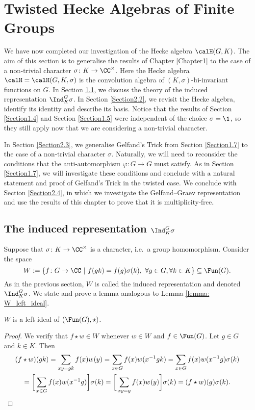 \section{Twisted Hecke Algebras of Finite Groups}\label{Chapter2}
We have now completed our investigation of the Hecke algebra $\calH(G,K)$.
The aim of this section is to generalise the results of Chapter \ref{Chapter1} to the case of a non-trivial character $\sigma\colon K\to\CC^\times$.
Here the Hecke algebra $\calH=\calH(G,K,\sigma)$ is the convolution algebra of $(K,\sigma)$-bi-invariant functions on $G$.
In Section \ref{Section2.1}, we discuss the theory of the induced representation $\Ind_K^G \sigma$.
In Section \ref{Section2.2}, we revisit the Hecke algebra, identify its identity and describe its basis.
Notice that the results of Section \ref{Section1.4} and Section \ref{Section1.5} were independent of the choice $\sigma=\1$, so they still apply now that we are considering a non-trivial character.

In Section \ref{Section2.3}, we generalise Gelfand's Trick from Section \ref{Section1.7} to the case of a non-trivial character $\sigma$.
Naturally, we will need to reconsider the conditions that the anti-automorphism $\varphi\colon G\to G$ must satisfy.
As in Section \ref{Section1.7}, we will investigate these conditions and conclude with a natural statement and proof of Gelfand's Trick in the twisted case.
We conclude with Section \ref{Section2.4}, in which we investigate the Gelfand--Graev representation and use the results of this chapter to prove that it is multiplicity-free.


\subsection{The induced representation $\Ind_K^G \sigma$}\label{Section2.1}
Suppose that $\sigma\colon K \to\CC^\times$ is a character, i.e.\ a group homomorphism.
Consider the space
\[
    W := \{f\colon G\to \CC\ |\ f(gk) = f(g)\sigma(k),\ \forall g\in G, \forall k \in K\} \subseteq \Fun(G).
\]
As in the previous section, $W$ is called the induced representation and denoted $\Ind_K^G \sigma$.
We state and prove a lemma analogous to Lemma \ref{lemma: W_left_ideal}.
\begin{lem}\label{lemma: W_left_ideal_two}
    $W$ is a left ideal of $(\Fun(G),\star)$.
\end{lem}
\begin{proof}
    We verify that $f\star w\in W$ whenever $w\in W$ and $f\in\Fun(G)$.
    Let $g\in G$ and $k\in K$.
    Then
    \begin{multline*}
        (f\star w)(gk) = \sum_{xy=gk} f(x)w(y) = \sum_{x\in G} f(x)w(x^{-1}gk) = \sum_{x\in G} f(x)w(x^{-1}g)\sigma(k) \\
        = \bigg[\sum_{x\in G} f(x)w(x^{-1}g)\bigg]\sigma(k) = \bigg[\sum_{xy=g} f(x)w(y)\bigg]\sigma(k) = (f\star w)(g)\sigma(k).\qedhere
    \end{multline*}
\end{proof}

